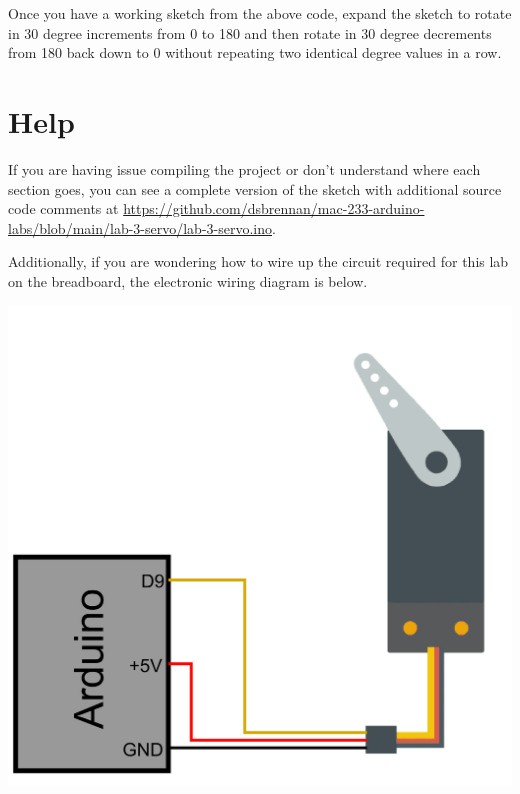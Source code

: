 \documentclass[11pt,a4paper]{article}
\begin{document}
\noindent
Once you have a working sketch from the above code, expand the sketch to rotate in 30 degree increments from 0 to 180 and then rotate in 30 degree decrements from 180 back down to 0 without repeating two identical degree values in a row.

\pagebreak
\section*{Help}
If you are having issue compiling the project or don't understand where each section goes, you can see a complete version of the sketch with additional source code comments at \url{https://github.com/dsbrennan/mac-233-arduino-labs/blob/main/lab-3-servo/lab-3-servo.ino}.

\vspace{2em}

\begin{center}
\end{center}

\vspace{2em}

\noindent
Additionally, if you are wondering how to wire up the circuit required for this lab on the breadboard, the electronic wiring diagram is below.

\begin{center}
    \includegraphics[width=.5\textwidth]{./images/wiring-diagram.png}
\end{center}
\end{document}
